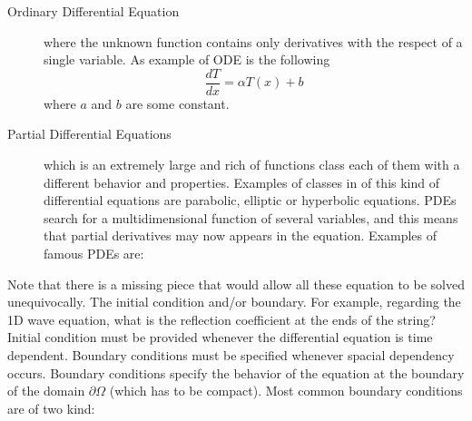 \begin{description}
\item[Ordinary Differential Equation] where the unknown function contains only derivatives with the respect of a single variable. As example of ODE is the following
\[
  \frac{d T}{d x} = \alpha T(x) +b
\] where $a$ and $b$ are some constant.

\item [Partial Differential Equations] which is an extremely large and rich of functions class each of them with a different behavior and properties. Examples of classes in of this kind of differential equations are parabolic, elliptic or hyperbolic equations. PDEs search for a multidimensional function of several variables, and this means that partial derivatives may now appears in the equation. 
Examples of famous PDEs are:
\end{description}
Note that there is a missing piece that would allow all these equation to be solved unequivocally. The initial condition and/or boundary. For example, regarding the 1D wave equation, what is the reflection coefficient at the ends of the string? 
Initial condition must be provided whenever the differential equation is time dependent. Boundary conditions must be specified whenever spacial dependency occurs. Boundary conditions specify the behavior of the equation at the boundary of the domain $\partial \Omega$ (which has to be compact). Most common boundary conditions are of two kind:
